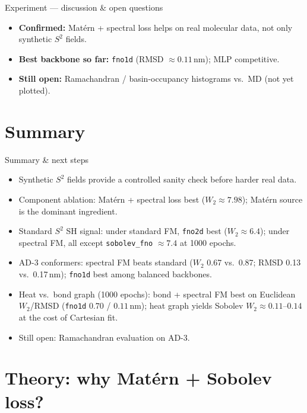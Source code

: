 \documentclass[aspectratio=169,11pt]{beamer}
\begin{document}
\begin{frame}{Experiment --- discussion \& open questions}
  \begin{itemize}
    \item \textbf{Confirmed:} Mat\'ern + spectral loss helps on real molecular data, not only synthetic $S^2$ fields.
    \item \textbf{Best backbone so far:} \texttt{fno1d} (RMSD $\approx 0.11$\,nm); MLP competitive.
    \item \textbf{Still open:} Ramachandran / basin-occupancy histograms vs.\ MD (not yet plotted).
  \end{itemize}
\end{frame}

\section{Summary}

\begin{frame}{Summary \& next steps}
  \begin{itemize}
    \item Synthetic $S^2$ fields provide a controlled sanity check before harder real data.
    \item Component ablation: Mat\'ern + spectral loss best ($W_2 \approx 7.98$); Mat\'ern source is the dominant ingredient.
    \item Standard $S^2$ SH signal: under standard FM, \texttt{fno2d} best ($W_2 \approx 6.4$); under spectral FM, all except \texttt{sobolev\_fno} $\approx 7.4$ at 1000 epochs.
    \item AD-3 conformers: spectral FM beats standard ($W_2$ 0.67 vs.\ 0.87; RMSD 0.13 vs.\ 0.17\,nm); \texttt{fno1d} best among balanced backbones.
    \item Heat vs.\ bond graph (1000 epochs): bond + spectral FM best on Euclidean $W_2$/RMSD (\texttt{fno1d} $0.70$ / $0.11$\,nm); heat graph yields Sobolev $W_2 \approx 0.11$--$0.14$ at the cost of Cartesian fit.
    \item Still open: Ramachandran evaluation on AD-3.
  \end{itemize}
\end{frame}

\section{Theory: why Mat\'ern + Sobolev loss?}
\end{document}
